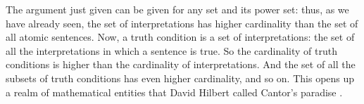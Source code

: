 The argument just given can be given for any set and its power set: thus, as we 
have already seen, the set of interpretations has higher cardinality than the 
set of all atomic sentences. Now, a truth condition is a set of interpretations: 
the set of all the interpretations in which a sentence is true.  So the 
cardinality of truth conditions is higher than the cardinality of 
interpretations. And the set of all the subsets of truth conditions has even 
higher cardinality, and so on.   This opens up a realm of mathematical entities 
that David Hilbert called Cantor's paradise  \citeyearpar{hilbert1926}.




